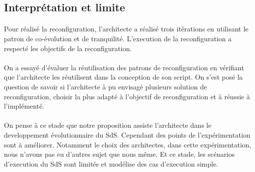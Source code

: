 \subsection{Interprétation et limite}

\paragraph{}
Pour réalisé la reconfiguration, l'architecte a réalisé trois
itérations en utilisant le patron de co-évolution et de tranquilité. 
L'execution de la reconfiguration a respecté les objectifs de la
reconfiguration. 

\paragraph{} 
On a essayé d'évaluer la réutilisation des patrons de reconfiguration
en vérifiant que l'architecte les réutilisent dans la conception de
son script. 
On s'est posé la question de savoir si l'architecte à pu envisagé
plusieurs solution de reconfiguration, choisir la plus adapté à
l'objectif de reconfiguration et à réussie à l'implémenté. 


\paragraph{} 
On pense à ce stade que notre proposition assiste l'architecte dans le
developpement évolutionnaire du SdS. 
Cependant des points de l'expérimentation sont à améliorer. Notamment
le choix des architectes, dans cette expérimentation, nous n'avons
pas eu d'autres sujet que nous même. 
Et ce stade, les scénarios d'execution du SdS sont limités et
modélise des cas d'execution simple. 
 
